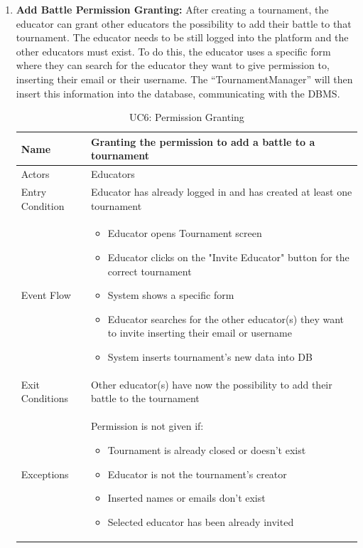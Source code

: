 \begin{enumerate}
   \newpage
   
   \item \textbf{Add Battle Permission Granting:}
    After creating a tournament, the educator can grant other educators the possibility to add their battle to that tournament. The educator needs to be still logged into the platform and the other educators must exist. To do this, the educator uses a specific form where they can search for the educator they want to give permission to, inserting their email or their username. The “TournamentManager” will then insert this information into the database, communicating with the DBMS.
    
   \begin{table}[H]
       \centering
       \begin{tabular}{|l|m{11cm}|}
        \hline
            Name & Granting the permission to add a battle to a tournament\\
        \hline
            Actors & Educators\\
        \hline
            Entry Condition & Educator has already logged in and has created at least one tournament\\
        \hline
            Event Flow & 
            \begin{itemize}
                \item Educator opens Tournament screen
                \item Educator clicks on the "Invite Educator" button for the correct tournament
                \item System shows a specific form
                \item Educator searches for the other educator(s) they want to invite inserting their email or username
                \item System inserts tournament's new data into DB
            \end{itemize}\\
        \hline
            Exit Conditions & Other educator(s) have now the possibility to add their battle to the tournament\\
        \hline
            Exceptions & Permission is not given if: 
            \begin{itemize}
                \item Tournament is already closed or doesn't exist
                \item Educator is not the tournament's creator
                \item Inserted names or emails don't exist
                \item Selected educator has been already invited
            \end{itemize}\\
        \hline
       \end{tabular}
       \caption{UC6: Permission Granting}
       \label{tab:uc6}
   \end{table}
   

\end{enumerate}
